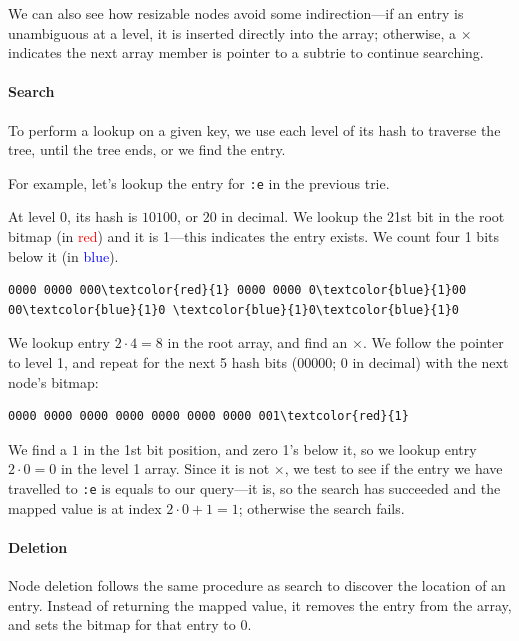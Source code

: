 \documentclass[preprint]{sigplanconf}
\begin{document}
We can also see how resizable nodes avoid some 
indirection---if an entry is unambiguous
at a level, it is inserted directly into the
array; otherwise, a $\times$ indicates
the next array member is pointer to a
subtrie to continue searching.

\paragraph{Search}
To perform a lookup on a given key, 
we use each level of its hash to
traverse the tree, until the tree
ends, or we find the entry.

For example, let's lookup the entry
for \texttt{:e} in the previous trie.

At level 0, its hash is $10100$, or
$20$ in decimal.
We lookup the 21st bit in the root
bitmap (in \textcolor{red}{red}) and it is 1---this
indicates the entry exists.
We count four 1 bits below it (in \textcolor{blue}{blue}).

\begin{Verbatim}[commandchars=\\\{\},codes={\catcode`$=3\catcode`^=7\catcode`_=8}]
0000 0000 000\textcolor{red}{1} 0000 0000 0\textcolor{blue}{1}00 00\textcolor{blue}{1}0 \textcolor{blue}{1}0\textcolor{blue}{1}0
\end{Verbatim}

We lookup entry $2\cdot4 = 8$ in
the root array, and find an $\times$.
We follow the pointer to level 1, and
repeat for the next 5 hash bits ($00000$; $0$ in decimal)
with the next node's bitmap:

\begin{Verbatim}[commandchars=\\\{\},codes={\catcode`$=3\catcode`^=7\catcode`_=8}]
0000 0000 0000 0000 0000 0000 0000 001\textcolor{red}{1}
\end{Verbatim}

We find a $1$ in the 1st bit position, and zero
1's below it, so we lookup entry
$2\cdot0 = 0$ in the level 1 array.
Since it is not $\times$, we test
to see if the entry we have travelled
to \texttt{:e} is equals to 
our query---it is, so the search has
succeeded and the mapped value is at index
$2\cdot0+1 = 1$; otherwise
the search fails.

\paragraph{Deletion}
Node deletion follows the same procedure as search to
discover the location of an entry.
Instead of returning the mapped value, it removes
the entry from the array, and sets the bitmap
for that entry to 0.
\end{document}
